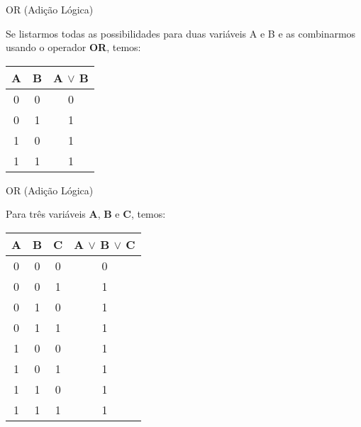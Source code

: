 \begin{frame}{OR (Adição Lógica)} 
	

	Se listarmos todas as possibilidades para duas variáveis A e B e as combinarmos usando o operador \textbf{OR}, temos:

		\center 
		\begin{tabular}{|c|c|c|} \hline 
			\textbf{A} & \textbf{B} & \textbf{A $\vee$ B} \\ \hline 
			0 & 0 & 0 \\ \hline 
			0 & 1 & 1 \\ \hline 
			1 & 0 & 1 \\ \hline 
			1 & 1 & 1 \\ \hline 
		\end{tabular} 


\end{frame}


\begin{frame}{OR (Adição Lógica)} 
	

	Para três variáveis \textbf{A}, \textbf{B} e \textbf{C}, temos:
	\center
		
		\begin{tabular}{|c|c|c|c|} \hline 
			\textbf{A} & \textbf{B} & \textbf{C} & \textbf{A $\vee$ B $\vee$ C} \\ \hline 
			0 & 0 & 0      & 0 \\ \hline 
			0 & 0 & 1      & 1 \\ \hline 
			0 & 1 & 0      & 1 \\ \hline 
			0 & 1 & 1      & 1 \\ \hline 
			1 & 0 & 0      & 1 \\ \hline 
			1 & 0 & 1      & 1 \\ \hline 
			1 & 1 & 0      & 1 \\ \hline 
			1 & 1 & 1      & 1 \\ \hline 
		\end{tabular} 

\end{frame}


